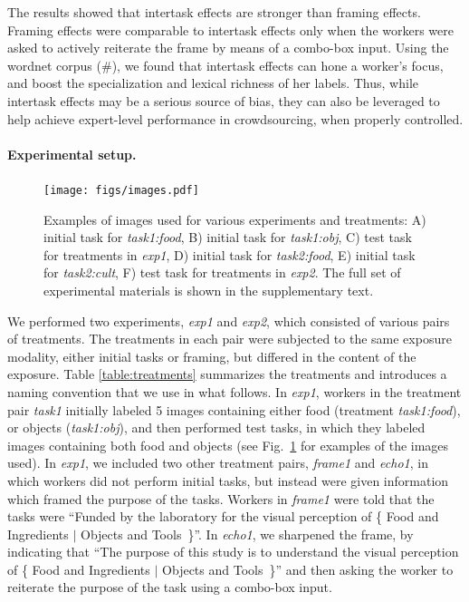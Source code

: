 \documentclass[12pt]{article}
\begin{document}
The results showed that intertask effects are stronger than framing effects.  
Framing effects were comparable to intertask effects only when the workers 
were asked to actively reiterate the frame by means of a combo-box input.
Using the wordnet corpus (\#), we found that intertask 
effects can hone a worker's focus, and boost the specialization
and lexical richness of her labels.  Thus, while intertask effects may be a 
serious source of bias, they can also be leveraged to help achieve
expert-level performance in crowdsourcing, when properly controlled.

\paragraph{Experimental setup.}
\begin{figure}
	\centering
	\texttt{[image: figs/images.pdf]}
	\caption{
		Examples of images used for various experiments and treatments:
		A) initial task for \textit{task1:food}, B) initial task for 
		\textit{task1:obj}, C) test task for treatments in \textit{exp1}, 
		D) initial task for \textit{task2:food}, 
		E) initial task for \textit{task2:cult},  
		F) test task for treatments in \textit{exp2}.  
		The full set of experimental materials is shown in the 
		supplementary text.
	}

	\label{fig:task}
\end{figure}

We performed two experiments, \textit{exp1} and \textit{exp2}, which consisted
of various pairs of treatments.  The treatments in each pair were subjected to
the same exposure modality, either initial tasks or framing, but differed in
the content of the exposure.  Table \ref{table:treatments}  
summarizes the treatments and introduces a naming convention that we use 
in what follows.
In \textit{exp1}, workers in the treatment pair \textit{task1} initially
labeled 5 images containing either food (treatment \textit{task1:food}), or 
objects (\textit{task1:obj}), and then performed test tasks, in 
which they 
labeled images containing both food and objects (see Fig.~\ref{fig:task} for 
examples of the images used). In \textit{exp1}, we included two other 
treatment pairs, \textit{frame1} and \textit{echo1}, in which workers did not 
perform initial tasks, but instead were given information which framed the 
purpose of the tasks.  Workers in \textit{frame1} were told that the tasks 
were ``Funded by the laboratory for the visual perception of 
\{ Food and Ingredients $\vert$ Objects and Tools~\}''.  In \textit{echo1},
we sharpened the frame, by indicating that ``The purpose of this study is to 
understand the visual perception of 
\{ Food and Ingredients $\vert$ Objects and Tools~\}'' and then asking the
worker to reiterate the purpose of the task using a combo-box input.
\end{document}
